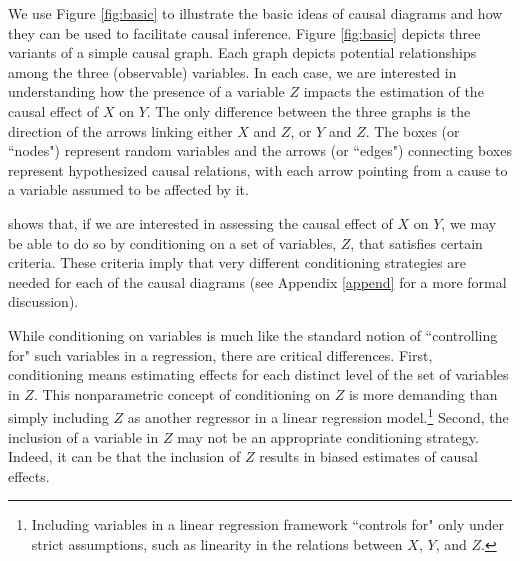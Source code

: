 \documentclass[12pt,reqno,titlepage]{amsart}
\theoremstyle{definition}
\begin{document}
\begin{doublespace}
We use Figure \ref{fig:basic} to illustrate the basic ideas of causal diagrams and how they can be used to facilitate causal inference.
Figure \ref{fig:basic} depicts three variants of a simple causal graph.
Each graph depicts potential relationships among the three (observable) variables.
In each case, we are interested in understanding how the presence of a variable $Z$ impacts the estimation of the causal effect of $X$ on $Y$.
The only difference between the three graphs is the direction of the arrows linking either $X$ and $Z$, or $Y$ and $Z$.
The boxes (or ``nodes") represent random variables and the arrows (or ``edges") connecting boxes represent hypothesized causal relations, with each arrow pointing from a cause to a variable assumed to be affected by it.

\citet{Pearl:2009vo} shows that, if we are interested in assessing the causal effect of $X$ on $Y$, we may be able to do so by conditioning on a set of variables, $Z$, that satisfies certain criteria.
These criteria imply that very different conditioning strategies are needed for each of the causal diagrams (see Appendix \ref{append} for a more formal discussion).

While conditioning on variables is much like the standard notion of ``controlling for" such variables in a regression, there are critical differences.
First, conditioning means estimating effects for each distinct level of the set of variables in $Z$. 
This nonparametric concept of conditioning on $Z$ is more demanding than simply including $Z$ as another regressor in a linear regression model.\footnote{Including variables in a linear regression framework ``controls for" only under strict assumptions, such as linearity in the relations between $X$, $Y$, and $Z$.}
Second, the inclusion of a variable in $Z$ may not be an appropriate conditioning strategy. 
Indeed, it can be that the inclusion of $Z$ results in biased estimates of causal effects.


\end{doublespace}
\end{document}
